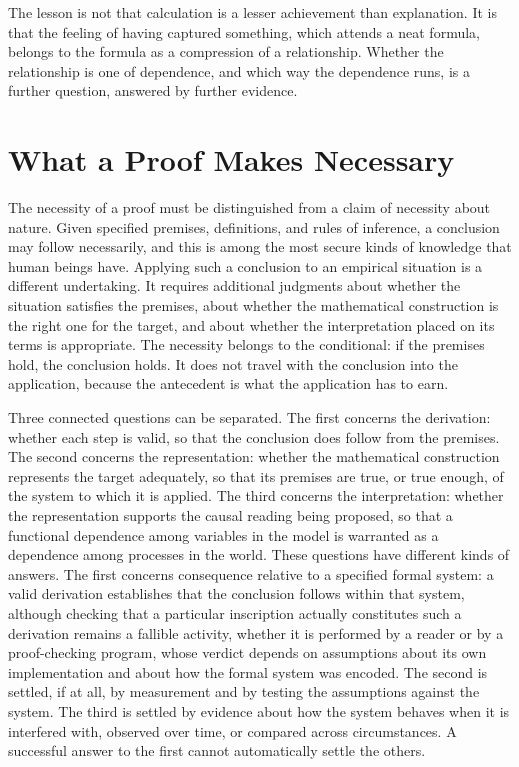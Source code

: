 \documentclass[11pt,letterpaper]{article}
\theoremstyle{definition}
\begin{document}
The lesson is not that calculation is a lesser achievement than explanation. It is that the feeling of having captured something, which attends a neat formula, belongs to the formula as a compression of a relationship. Whether the relationship is one of dependence, and which way the dependence runs, is a further question, answered by further evidence.

\section{What a Proof Makes Necessary}

The necessity of a proof must be distinguished from a claim of necessity about nature. Given specified premises, definitions, and rules of inference, a conclusion may follow necessarily, and this is among the most secure kinds of knowledge that human beings have. Applying such a conclusion to an empirical situation is a different undertaking. It requires additional judgments about whether the situation satisfies the premises, about whether the mathematical construction is the right one for the target, and about whether the interpretation placed on its terms is appropriate. The necessity belongs to the conditional: if the premises hold, the conclusion holds. It does not travel with the conclusion into the application, because the antecedent is what the application has to earn.

Three connected questions can be separated. The first concerns the derivation: whether each step is valid, so that the conclusion does follow from the premises. The second concerns the representation: whether the mathematical construction represents the target adequately, so that its premises are true, or true enough, of the system to which it is applied. The third concerns the interpretation: whether the representation supports the causal reading being proposed, so that a functional dependence among variables in the model is warranted as a dependence among processes in the world. These questions have different kinds of answers. The first concerns consequence relative to a specified formal system: a valid derivation establishes that the conclusion follows within that system, although checking that a particular inscription actually constitutes such a derivation remains a fallible activity, whether it is performed by a reader or by a proof-checking program, whose verdict depends on assumptions about its own implementation and about how the formal system was encoded. The second is settled, if at all, by measurement and by testing the assumptions against the system. The third is settled by evidence about how the system behaves when it is interfered with, observed over time, or compared across circumstances. A successful answer to the first cannot automatically settle the others.
\end{document}
